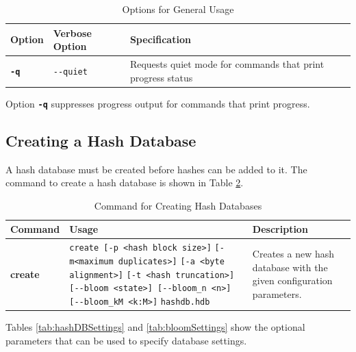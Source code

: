 \documentclass[11pt,fleqn]{article} %
\begin{document}
\begin{table}[!ht]
\centering
\caption{Options for General Usage}
\label{tab:general}
\begin{tabular}{|p{1.5 cm}|p{8 cm}|p{4 cm}|}
\hline \hline
\textbf{Option} & \textbf{Verbose Option} & \textbf{Specification} \\
\hline
\textbf{\texttt{-q}} & \verb+--quiet+ & Requests quiet mode for commands that print progress status\\
\hline
\end{tabular}
\end{table}

Option \textbf{\texttt{-q}} suppresses progress output for commands that print progress.\\

\subsection{Creating a Hash Database}
A hash database must be created before hashes can be added to it.
The command to create a hash database is shown in Table \ref{tab:createDatabase}.
\begin{table}[!ht]
\centering
\caption{Command for Creating Hash Databases}
\label{tab:createDatabase}
\begin{tabular}{|p{2.5 cm}|p{7 cm}|p{4 cm}|}
\hline \hline
\textbf{Command} & \textbf{Usage} & \textbf{Description} \\
\hline
\textbf{create} & \verb+create [-p <hash block size>]+ \verb+[-m<maximum duplicates>]+ \verb+[-a <byte alignment>]+ \verb+[-t <hash truncation>]+ \verb+[--bloom <state>] [--bloom_n <n>]+ \verb+[--bloom_kM <k:M>]+ \verb+hashdb.hdb+ & Creates a new hash database with the given configuration parameters.\\
\hline
\end{tabular}
\end{table}

Tables \ref{tab:hashDBSettings} and \ref{tab:bloomSettings} show the optional parameters that can be used to specify database settings.\\
\end{document}
